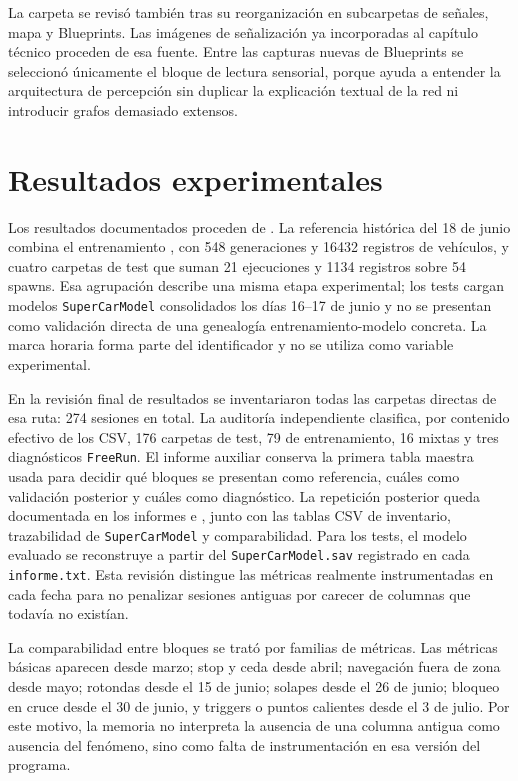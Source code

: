 La carpeta  se revisó también tras su reorganización en subcarpetas de señales, mapa y Blueprints. Las imágenes de señalización ya incorporadas al capítulo técnico proceden de esa fuente. Entre las capturas nuevas de Blueprints se seleccionó únicamente el bloque de lectura sensorial, porque ayuda a entender la arquitectura de percepción sin duplicar la explicación textual de la red ni introducir grafos demasiado extensos.

\section{Resultados experimentales}

Los resultados documentados proceden de . La referencia histórica del 18 de junio combina el entrenamiento , con 548 generaciones y 16432 registros de vehículos, y cuatro carpetas de test que suman 21 ejecuciones y 1134 registros sobre 54 spawns. Esa agrupación describe una misma etapa experimental; los tests cargan modelos \texttt{SuperCarModel} consolidados los días 16--17 de junio y no se presentan como validación directa de una genealogía entrenamiento-modelo concreta. La marca horaria forma parte del identificador y no se utiliza como variable experimental.

En la revisión final de resultados se inventariaron todas las carpetas directas de esa ruta: 274 sesiones en total. La auditoría independiente clasifica, por contenido efectivo de los CSV, 176 carpetas de test, 79 de entrenamiento, 16 mixtas y tres diagnósticos \texttt{FreeRun}. El informe auxiliar  conserva la primera tabla maestra usada para decidir qué bloques se presentan como referencia, cuáles como validación posterior y cuáles como diagnóstico. La repetición posterior queda documentada en los informes  e , junto con las tablas CSV de inventario, trazabilidad de \texttt{SuperCarModel} y comparabilidad. Para los tests, el modelo evaluado se reconstruye a partir del \texttt{SuperCarModel.sav} registrado en cada \texttt{informe.txt}. Esta revisión distingue las métricas realmente instrumentadas en cada fecha para no penalizar sesiones antiguas por carecer de columnas que todavía no existían.

La comparabilidad entre bloques se trató por familias de métricas. Las métricas básicas aparecen desde marzo; stop y ceda desde abril; navegación fuera de zona desde mayo; rotondas desde el 15 de junio; solapes desde el 26 de junio; bloqueo en cruce desde el 30 de junio, y triggers o puntos calientes desde el 3 de julio. Por este motivo, la memoria no interpreta la ausencia de una columna antigua como ausencia del fenómeno, sino como falta de instrumentación en esa versión del programa.

